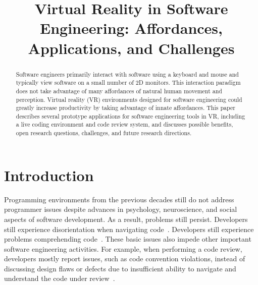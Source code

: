 \documentclass[conference]{IEEEtran}
\begin{document}
\title{Virtual Reality in Software Engineering: Affordances, Applications, and Challenges}

\author{
\and
{}
\and
{}
}

\maketitle
\begin{abstract}
Software engineers primarily interact with software using a keyboard and mouse and typically view software on a small number of 2D monitors.
This interaction paradigm does not take advantage of many affordances of natural human movement and perception.
Virtual reality (VR) environments designed for software engineering could greatly increase productivity by taking advantage of innate affordances.
This paper describes several prototype applications for software engineering tools in VR, including a live coding environment and code review system, and discusses possible benefits, open research questions, challenges, and future research directions.
\end{abstract}

\section{Introduction}

Programming environments from the previous decades still do not address programmer issues despite advances in psychology, neuroscience, and social aspects of software development.
As a result, problems still persist.  Developers still experience disorientation when navigating code~\cite{Henley:2014}.
Developers still experience problems comprehending code~\cite{Maalej:TOSEM:2014}.  These basic issues also impede other important software engineering activities. For example,
when performing a code review, developers mostly report issues, such as code convention violations, instead of discussing design flaws or defects
due to insufficient ability to navigate and understand the code under review~\cite{bacchelli:ModernCodeReviewChallenges}.  
\end{document}
